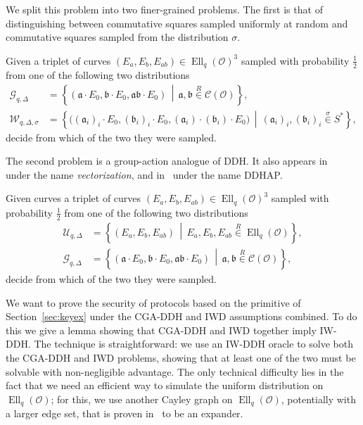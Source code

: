 \documentclass{llncs}
\newcommand{\Cl}{\mathcal{C}}
\renewcommand{\O}{\mathcal{O}}
\newcommand{\suchthat}{\,\middle\vert\,}
\renewcommand{\frak}{\mathfrak}
\newcommand{\rand}[1]{\overset{#1}{∈}}
\newcommand{\uni}{\rand{R}}
\DeclareMathOperator{\Ell}{Ell}
\begin{document}
We split this problem into two finer-grained problems. 
The first is that of distinguishing between 
commutative squares sampled uniformly at random 
and commutative squares sampled from the distribution $σ$.

\begin{definition}
    Given a triplet of curves $(E_a,E_b,E_{ab})∈\Ell_q(\O)^3$
    sampled with probability $\frac{1}{2}$ 
    from one of the following two distributions
  \begin{align*}
    \mathcal{G}_{q,Δ} &= \left\{(\frak a·E_0,\frak b·E_0,\frak{ab}·E_0) \suchthat
                        \frak a,\frak b\uni\Cl(\O)\right\},\\
    \mathcal{W}_{q,Δ,σ} &= \left\{\bigl((\frak a_i)_i·E_0,(\frak b_i)_i·E_0,(\frak a_i)·(\frak b_i)·E_0\bigr) \suchthat
                          (\frak a_i)_i,(\frak b_i)_i\rand{σ}S^*\right\},
  \end{align*}
  decide from which of the two they were sampled.
\end{definition}

The second problem is a group-action analogue of DDH.
It also appears in~\cite{cryptoeprint:2006:291} under the
name \emph{vectorization}, and in~\cite{Stol,Stolbunov2012} under the
name DDHAP.
 
\begin{definition}
    Given curves a triplet of curves $(E_a,E_b,E_{ab})∈\Ell_q(\O)^3$ 
    sampled with probability $\frac{1}{2}$ 
    from one of the following two distributions
  \begin{align*}
    \mathcal{U}_{q,Δ} &= \left\{(E_a,E_b,E_{ab}) \suchthat E_a,E_b,E_{ab}\uni\Ell_q(\O)\right\},\\
    \mathcal{G}_{q,Δ} &= \left\{(\frak a·E_0,\frak b·E_0,\frak{ab}·E_0) \suchthat
                        \frak a,\frak b\uni\Cl(\O)\right\},
  \end{align*}
  decide from which of the two they were sampled.
\end{definition}

We want to prove the security of protocols based on the primitive of
Section~\ref{sec:keyex} under the CGA-DDH and IWD assumptions
combined. To do this we give a lemma showing that CGA-DDH and IWD
together imply IW-DDH. The technique is straightforward: we use an
IW-DDH oracle to solve both the CGA-DDH and IWD problems, showing that
at least one of the two must be solvable with non-negligible
advantage. The only technical difficulty lies in the fact that we need
an efficient way to simulate the uniform distribution on $\Ell_q(\O)$;
for this, we use another Cayley graph on $\Ell_q(\O)$, potentially
with a larger edge set, that is proven
in~\cite{jao+miller+venkatesan09} to be an expander.
\end{document}
